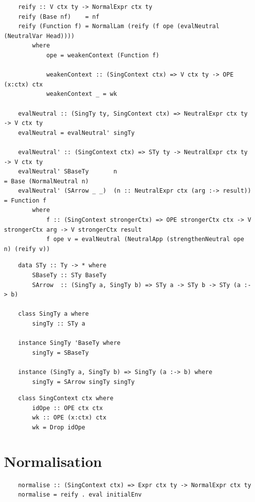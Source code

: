 \begin{lstlisting}
    reify :: V ctx ty -> NormalExpr ctx ty
    reify (Base nf)    = nf
    reify (Function f) = NormalLam (reify (f ope (evalNeutral (NeutralVar Head)))) 
        where
            ope = weakenContext (Function f)

            weakenContext :: (SingContext ctx) => V ctx ty -> OPE (x:ctx) ctx
            weakenContext _ = wk 

    evalNeutral :: (SingTy ty, SingContext ctx) => NeutralExpr ctx ty -> V ctx ty
    evalNeutral = evalNeutral' singTy

    evalNeutral' :: (SingContext ctx) => STy ty -> NeutralExpr ctx ty -> V ctx ty
    evalNeutral' SBaseTy       n                                       = Base (NormalNeutral n)  
    evalNeutral' (SArrow _ _)  (n :: NeutralExpr ctx (arg :-> result)) = Function f 
        where
            f :: (SingContext strongerCtx) => OPE strongerCtx ctx -> V strongerCtx arg -> V strongerCtx result
            f ope v = evalNeutral (NeutralApp (strengthenNeutral ope n) (reify v))
\end{lstlisting}


\begin{lstlisting}
    data STy :: Ty -> * where
        SBaseTy :: STy BaseTy
        SArrow  :: (SingTy a, SingTy b) => STy a -> STy b -> STy (a :-> b)

    class SingTy a where
        singTy :: STy a 

    instance SingTy 'BaseTy where
        singTy = SBaseTy

    instance (SingTy a, SingTy b) => SingTy (a :-> b) where
        singTy = SArrow singTy singTy
\end{lstlisting}

\begin{lstlisting}
    class SingContext ctx where
        idOpe :: OPE ctx ctx
        wk :: OPE (x:ctx) ctx
        wk = Drop idOpe
\end{lstlisting}

\section{Normalisation}

\begin{lstlisting}
    normalise :: (SingContext ctx) => Expr ctx ty -> NormalExpr ctx ty
    normalise = reify . eval initialEnv
\end{lstlisting}

